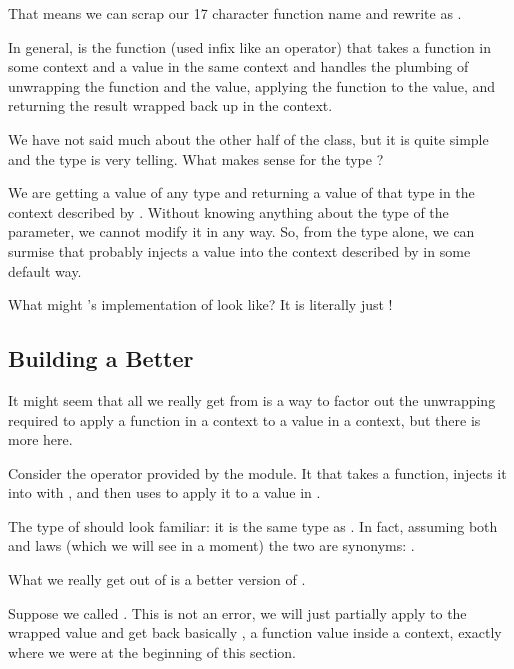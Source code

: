 That means we can scrap our 17 character function name and rewrite  as 
.

In general, \code{(<*>)} is the function (used infix like an operator) that takes a function in some  context
 and a value in the same context and handles the plumbing of unwrapping the function and the value, applying the function
to the value, and returning the result wrapped back up in the  context.

We have not said much about the other half of the  class, but it is quite simple and the type is very telling.
What makes sense for the type ?

We are getting a value of any type and returning a value of that type in the context described by . Without knowing
anything about the type  of the parameter, we cannot modify it in any way. So, from the type alone, we can surmise that
 probably injects a value into the context described by  in some default way.

What might 's implementation of  look like? It is literally just !

\subsection{Building a Better }

It might seem that all we really get from  is a way to factor out the unwrapping required to apply a function
in a context to a value in a context, but there is more here.

Consider the operator  provided by the  module.
It that takes a function, injects it into  with , and then uses \code{(<*>)} to apply it to a value
in . 

The type of \code{(<\$>)} should look familiar: it is the same type as . In fact, assuming both 
and  laws (which we will see in a moment) the two are synonyms: .

What we really get out of  is a better version of .

Suppose we called . This is not an error, we will just partially apply \code{(+)} to the wrapped
value  and get back basically , a function value inside a  context, exactly where 
we were at the beginning of this section.

